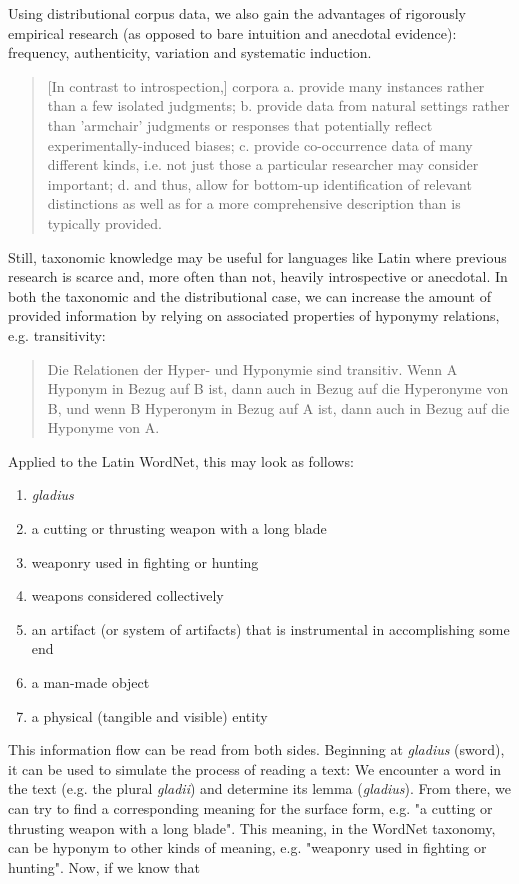 \documentclass[jou]{apa6} %
\begin{document}
Using distributional corpus data, we also gain the advantages of rigorously empirical research (as opposed to bare intuition and anecdotal evidence): frequency, authenticity, variation and systematic induction.
\blockquote[{\cite[p.~60]{griesBehavioralProfilesCorpusbased2009}}]{[In contrast to introspection,] corpora a. provide many instances rather than a few isolated judgments; b. provide data from natural settings rather than 'armchair' judgments or responses that potentially reflect experimentally-induced biases; c. provide co-occurrence data of many different kinds, i.e. not just those a particular researcher may consider important; d. and thus, allow for bottom-up identification of relevant distinctions as well as for a more comprehensive description than is typically provided.}
Still, taxonomic knowledge may be useful for languages like Latin where previous research is scarce and, more often than not, heavily introspective or anecdotal. In both the taxonomic and the distributional case, we can increase the amount of provided information by relying on associated properties of hyponymy relations, e.g. transitivity:
\blockquote[{\cite[p.~58]{coenenAnalogieUndMetapher2013}}]{Die Relationen der Hyper- und Hyponymie sind transitiv. Wenn A Hyponym in Bezug auf B ist, dann auch in Bezug auf die Hyperonyme von B, und wenn B Hyperonym in Bezug auf A ist, dann auch in Bezug auf die Hyponyme von A.}
Applied to the Latin WordNet, this may look as follows:
\begin{enumerate}
         \item \textit{gladius}
         \item a cutting or thrusting weapon with a long blade
         \item weaponry used in fighting or hunting
         \item weapons considered collectively
         \item an artifact (or system of artifacts) that is instrumental in accomplishing some end
         \item a man-made object
         \item a physical (tangible and visible) entity
\end{enumerate}
This information flow can be read from both sides. Beginning at \textit{gladius} (sword), it can be used to simulate the process of reading a text: We encounter a word in the text (e.g. the plural \textit{gladii}) and determine its lemma (\textit{gladius}). From there, we can try to find a corresponding meaning for the surface form, e.g. "a cutting or thrusting weapon with a long blade". This meaning, in the WordNet taxonomy, can be hyponym to other kinds of meaning, e.g. "weaponry used in fighting or hunting". Now, if we know that
\end{document}
